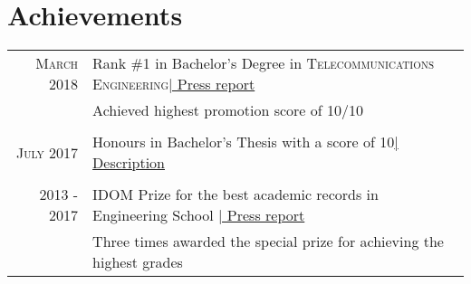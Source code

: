 \documentclass[a4paper,10pt]{article}
\begin{document}
\section{Achievements}
\begin{tabular}{rp{13.6cm}}
\textsc{March} 2018 & Rank \#1 in Bachelor's Degree in \textsc{Telecommunications Engineering}\href{https://www.ehu.eus/documents/6810447/9245968/2018+03+20+NdP+Entrega+diplomas+2018.pdf/fe66cb16-e67b-8cb0-01ca-73fe373ce92c}{\hfill | \footnotesize Press report}\\
&\footnotesize{Achieved highest promotion score of 10/10} \\&\\
\textsc{July} 2017 & Honours in Bachelor's Thesis with a score of 10\href{https://addi.ehu.es/handle/10810/23285?show=full}{\hfill | \footnotesize Description}\\&\\
2013 - 2017 & IDOM Prize for the best academic records in Engineering School \href{https://www.elcorreo.com/bizkaia/alumnos-sobresalientes-20180116213541-nt.html}{\hfill | \footnotesize Press report}\\
&\footnotesize{ Three times awarded the special prize for achieving the highest grades } \\
\end{tabular}


\end{document}
